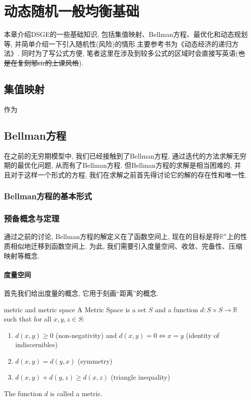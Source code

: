 \chapter{动态随机一般均衡基础}
本章介绍DSGE的一些基础知识, 包括集值映射、Bellman方程、最优化和动态规划等, 并简单介绍一下引入随机性(风险)的情形.主要参考书为《动态经济的递归方法》.
同时为了写公式方便, 笔者这里在涉及到较多公式的区域时会直接写英语(\sout{也是在复刻邬sir的上课风格}).

\section{集值映射}
作为
\section{Bellman方程}
在之前的无穷期模型中, 我们已经接触到了Bellman方程, 通过迭代的方法求解无穷期的最优化问题, 从而有了Bellman方程.
但Bellman方程的求解是相当困难的, 并且对于这样一个形式的方程, 我们在求解之前首先得讨论它的解的存在性和唯一性.
\subsection{Bellman方程的基本形式}

\subsection{预备概念与定理}
{\kaishu 通过之前的讨论, Bellman方程的解定义在了函数空间上, 现在的目标是将$\mathbb{R}^n$上的性质相似地迁移到函数空间上.
为此, 我们需要引入度量空间、收敛、完备性、压缩映射等概念.}
\subsubsection{度量空间}
首先我们给出度量的概念, 它用于刻画“距离”的概念.
\begin{definition}{metric and metric space}
    A Metric Space is a set $S$ and a function $d: S \times S \to \mathbb{R}$ such that for all $x, y, z \in S$:
    \begin{enumerate}
        \item $d(x, y) \geq 0$ (non-negativity) and $d(x, y) = 0 \iff x = y$ (identity of indiscernibles)
        \item $d(x, y) = d(y, x)$ (symmetry)
        \item $d(x, y) + d(y, z) \geq d(x, z)$ (triangle inequality)
    \end{enumerate}
    The function $d$ is called a metric.
\end{definition}

